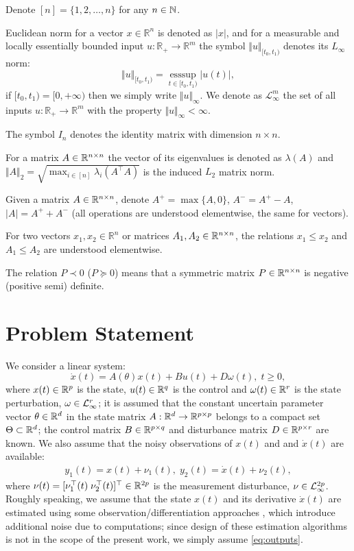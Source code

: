 \documentclass[letterpaper, 10 pt, conference]{ieeeconf}  %
\begin{document}
Denote $[n]=\{1,2,\dots,n\}$ for any $n\in\mathbb{N}$.

Euclidean norm for a vector $x\in\mathbb{R}^{n}$ is denoted
as $|x|$, and for a measurable and locally essentially bounded input
$u:\mathbb{R}_{+}\to\mathbb{R}^{m}$ the symbol $\Vert u\Vert_{[t_{0},t_{1})}$
denotes its $L_{\infty}$ norm:
\[
\Vert u\Vert_{[t_{0},t_{1})}=\underset{t\in[t_{0},t_{1})}{\text{ess}\sup}|u(t)|,
\]
if $[t_{0},t_{1})=[0,+\infty)$ then we simply write $\Vert u\Vert_{\infty}$.
We denote as $\mathcal{L}_{\infty}^{m}$ the set of all inputs
$u:\mathbb{R}_{+}\to\mathbb{R}^{m}$ with the property $\Vert u\Vert_{\infty}<\infty$.

The symbol $I_{n}$ denotes the identity matrix with dimension $n\times n$.

For a matrix $A\in\mathbb{R}^{n\times n}$ the vector of its eigenvalues
is denoted as $\lambda(A)$ and $\Vert A\Vert_{2}=\sqrt{\max_{i\in[n]}\lambda_{i}(A^{\top}A)}$
is the induced $L_{2}$ matrix norm.

Given a matrix $A\in\mathbb{R}^{n\times n}$, denote $A^{+}=\max\{A,0\}$,
$A^{-}=A^{+}-A$, $|A|=A^{+}+A^{-}$ (all operations are understood
elementwise, the same for vectors). 

For two vectors $x_{1},x_{2}\in\mathbb{R}^{n}$ or matrices $A_{1},A_{2}\in\mathbb{R}^{n\times n}$,
the relations $x_{1}\le x_{2}$ and $A_{1}\le A_{2}$ are understood
elementwise. 

The relation $P\prec0$ ($P\succeq0$) means that a symmetric matrix
$P\in\mathbb{R}^{n\times n}$ is negative (positive semi) definite.

\section{\label{sec:Problem} Problem Statement}

We consider a linear system: 
\begin{equation}
\dot{x}(t)=A(\theta)x(t)+Bu(t)+D\omega(t),\;t\geq0,\label{eq:dynamics}
\end{equation}
where $x(t)\in\mathbb{R}^{p}$ is the state, $u(t)\in\mathbb{R}^{q}$ is the
control and $\omega(t)\in\mathbb{R}^{r}$ is the state perturbation, $\omega\in\mathcal{L}_{\infty}^{r}$;
it is assumed that the constant uncertain parameter vector $\theta\in\mathbb{R}^{d}$
in the state matrix $A:\mathbb{R}^{d}\to\mathbb{R}^{p\times p}$ belongs to
a compact set $\Theta\subset\mathbb{R}^{d}$; the control matrix $B\in\mathbb{R}^{p\times q}$
and disturbance matrix $D\in\mathbb{R}^{p\times r}$ are known. We also
assume that the noisy observations of $x(t)$ and and $\dot{x}(t)$
are available:
\begin{gather}
y_{1}(t)=x(t)+\nu_{1}(t),\;y_{2}(t)=\dot{x}(t)+\nu_{2}(t),\label{eq:outputs}
\end{gather}
where $\nu(t)=[\nu_{1}^{\top}(t)\;\nu_{2}^{\top}(t)]^{\top}\in\mathbb{R}^{2p}$
is the measurement disturbance, $\nu\in\mathcal{L}_{\infty}^{2p}$. Roughly
speaking, we assume that the state $x(t)$ and its derivative $\dot{x}(t)$
are estimated using some observation/differentiation approaches \cite{Besancon2007,Reichhartinger2018},
which introduce additional noise due to computations; since design
of these estimation algorithms is not in the scope of the present
work, we simply assume \eqref{eq:outputs}. 
\end{document}
